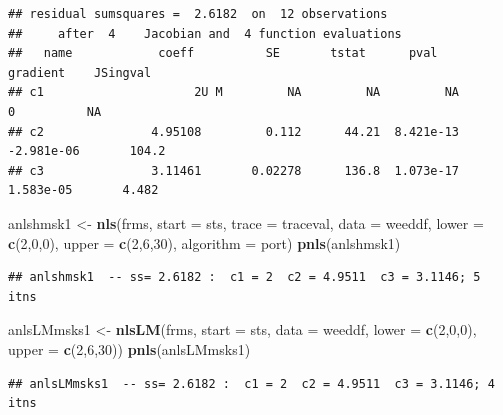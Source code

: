 \documentclass[
]{article}
\newenvironment{Shaded}{\begin{snugshade}}{\end{snugshade}}
\newcommand{\AttributeTok}[1]{\textcolor[rgb]{0.13,0.29,0.53}{#1}}
\newcommand{\DecValTok}[1]{\textcolor[rgb]{0.00,0.00,0.81}{#1}}
\newcommand{\FunctionTok}[1]{\textcolor[rgb]{0.13,0.29,0.53}{\textbf{#1}}}
\newcommand{\NormalTok}[1]{#1}
\newcommand{\OtherTok}[1]{\textcolor[rgb]{0.56,0.35,0.01}{#1}}
\newcommand{\StringTok}[1]{\textcolor[rgb]{0.31,0.60,0.02}{#1}}
\begin{document}
\begin{verbatim}
## residual sumsquares =  2.6182  on  12 observations
##     after  4    Jacobian and  4 function evaluations
##   name            coeff          SE       tstat      pval      gradient    JSingval   
## c1                     2U M         NA         NA         NA           0          NA  
## c2               4.95108         0.112      44.21  8.421e-13  -2.981e-06       104.2  
## c3               3.11461       0.02278      136.8  1.073e-17   1.583e-05       4.482
\end{verbatim}

\begin{Shaded}
\begin{Highlighting}[]
\NormalTok{anlshmsk1 }\OtherTok{\textless{}{-}} \FunctionTok{nls}\NormalTok{(frms, }\AttributeTok{start =}\NormalTok{ sts, }\AttributeTok{trace =}\NormalTok{ traceval, }\AttributeTok{data =}\NormalTok{ weeddf, }\AttributeTok{lower =} \FunctionTok{c}\NormalTok{(}\DecValTok{2}\NormalTok{,}\DecValTok{0}\NormalTok{,}\DecValTok{0}\NormalTok{),}
             \AttributeTok{upper =} \FunctionTok{c}\NormalTok{(}\DecValTok{2}\NormalTok{,}\DecValTok{6}\NormalTok{,}\DecValTok{30}\NormalTok{), }\AttributeTok{algorithm =} \StringTok{\textquotesingle{}port\textquotesingle{}}\NormalTok{)}
\FunctionTok{pnls}\NormalTok{(anlshmsk1)}
\end{Highlighting}
\end{Shaded}

\begin{verbatim}
## anlshmsk1  -- ss= 2.6182 :  c1 = 2  c2 = 4.9511  c3 = 3.1146; 5  itns
\end{verbatim}

\begin{Shaded}
\begin{Highlighting}[]
\NormalTok{anlsLMmsks1 }\OtherTok{\textless{}{-}} \FunctionTok{nlsLM}\NormalTok{(frms, }\AttributeTok{start =}\NormalTok{ sts, }\AttributeTok{data =}\NormalTok{ weeddf, }\AttributeTok{lower =} \FunctionTok{c}\NormalTok{(}\DecValTok{2}\NormalTok{,}\DecValTok{0}\NormalTok{,}\DecValTok{0}\NormalTok{),}
                 \AttributeTok{upper =} \FunctionTok{c}\NormalTok{(}\DecValTok{2}\NormalTok{,}\DecValTok{6}\NormalTok{,}\DecValTok{30}\NormalTok{))}
\FunctionTok{pnls}\NormalTok{(anlsLMmsks1)}
\end{Highlighting}
\end{Shaded}

\begin{verbatim}
## anlsLMmsks1  -- ss= 2.6182 :  c1 = 2  c2 = 4.9511  c3 = 3.1146; 4  itns
\end{verbatim}
\end{document}
